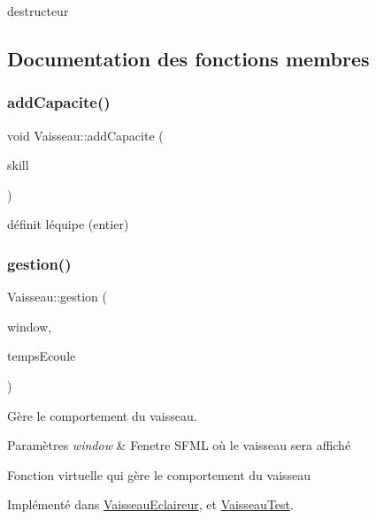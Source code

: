 destructeur 



\subsection{Documentation des fonctions membres}
\mbox{\label{class_vaisseau_a04d7069231187e7dba26a06a0aaf2508}} 
\subsubsection{\texorpdfstring{add\+Capacite()}{addCapacite()}}
{\footnotesize\ttfamily void Vaisseau\+::add\+Capacite (\begin{DoxyParamCaption}\item[{\hyperlink{class_capacite}{Capacite} $\ast$}]{skill }\end{DoxyParamCaption})}



définit l\textquotesingle{}équipe (entier) 

\mbox{\label{class_vaisseau_a98c129568d478586684b1769fe465803}} 
\subsubsection{\texorpdfstring{gestion()}{gestion()}}
{\footnotesize\ttfamily Vaisseau\+::gestion (\begin{DoxyParamCaption}\item[{sf\+::\+Render\+Window \&}]{window,  }\item[{float}]{temps\+Ecoule }\end{DoxyParamCaption})\hspace{0.3cm}{\ttfamily [pure virtual]}}



Gère le comportement du vaisseau. 


\begin{DoxyParams}{Paramètres}
{\em window} & Fenetre S\+F\+ML où le vaisseau sera affiché\\
\hline
\end{DoxyParams}
Fonction virtuelle qui gère le comportement du vaisseau 

Implémenté dans \hyperlink{class_vaisseau_eclaireur_aa76a51dfb92fa94b7614a58be187db21}{Vaisseau\+Eclaireur}, et \hyperlink{class_vaisseau_test_a50009e27227a8e1c4d18c16bfba0a55f}{Vaisseau\+Test}.

